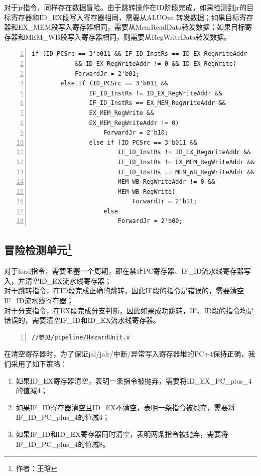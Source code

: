 \documentclass{article}
\begin{document}
            对于jr指令，同样存在数据冒险。由于跳转操作在ID阶段完成，如果检测到jr的目标寄存器和ID\_EX段写入寄存器相同，需要从ALUOut 转发数据；如果目标寄存器和EX\_MEM段写入寄存器相同，需要从MemReadData转发数据；如果目标寄存器和MEM\_WB段写入寄存器相同，则需要从RegWriteData转发数据。
            \begin{Verbatim}[frame=lines,numbers=left,stepnumber=5,label={ForwardUnit.v}]
        if (ID_PCSrc == 3'b011 && IF_ID_InstRs == ID_EX_RegWriteAddr
            && ID_EX_RegWriteAddr != 0 && ID_EX_RegWrite)
            ForwardJr = 2'b01;
        else if (ID_PCSrc == 3'b011 &&
                IF_ID_InstRs != ID_EX_RegWriteAddr &&
                IF_ID_InstRs == EX_MEM_RegWriteAddr &&
                EX_MEM_RegWrite &&
                EX_MEM_RegWriteAddr != 0)
                    ForwardJr = 2'b10;
                else if (ID_PCSrc == 3'b011 &&
                        IF_ID_InstRs != ID_EX_RegWriteAddr &&
                        IF_ID_InstRs != EX_MEM_RegWriteAddr &&
                        IF_ID_InstRs == MEM_WB_RegWriteAddr &&
                        MEM_WB_RegWriteAddr != 0 &&
                        MEM_WB_RegWrite)
                            ForwardJr = 2'b11;
                    else
                        ForwardJr = 2'b00;
            \end{Verbatim}
            
        \subsection{冒险检测单元\protect\footnote{作者：王晗}}
            对于load指令，需要阻塞一个周期，即在禁止PC寄存器、IF\_ID流水线寄存器写入，并清空ID\_EX流水线寄存器；\\
            对于跳转指令，在ID段完成正确的跳转，因此IF段的指令是错误的，需要清空IF\_ID流水线寄存器；\\
            对于分支指令，在EX段完成分支判断，因此如果成功跳转，IF、ID段的指令均是错误的，需要清空IF\_ID和ID\_EX流水线寄存器。
            \begin{Verbatim}[frame=lines,numbers=left,stepnumber=5,label={HazardUnit.v}]
    //参见/pipeline/HazardUnit.v
            \end{Verbatim}
            
            在清空寄存器时，为了保证jal/jalr/中断/异常写入寄存器堆的PC+4保持正确，我们采用了如下策略：
            \begin{enumerate}
              \item 如果ID\_EX寄存器清空，表明一条指令被抛弃，需要将ID\_EX\_PC\_plus\_4的值减4；
              \item 如果IF\_ID寄存器清空且ID\_EX不清空，表明一条指令被抛弃，需要将IF\_ID\_PC\_plus\_4的值减4；
              \item 如果IF\_ID和ID\_EX寄存器同时清空，表明两条指令被抛弃，需要将IF\_ID\_PC\_plus\_4的值减8。
            \end{enumerate}
            
\end{document}
